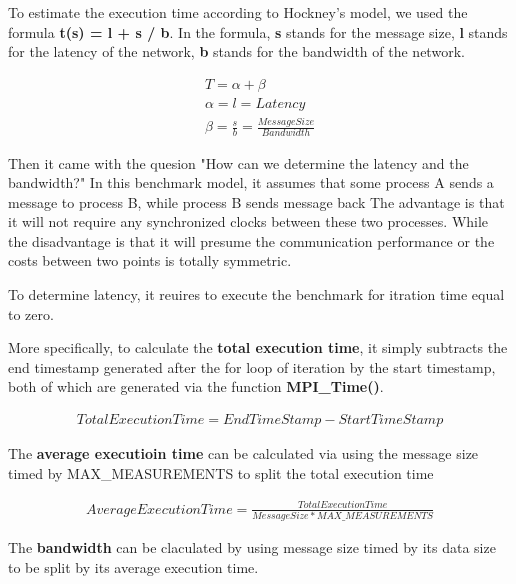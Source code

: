 

To estimate the execution time according to Hockney's model,
we used the formula \textbf{t(s) = l + s / b}. In the formula,
\textbf{s} stands for the message size,
\textbf{l} stands for the latency of the network,
\textbf{b} stands for the bandwidth of the network.


\begin{gather*}
    T = \alpha + \beta \\
    \alpha = l = Latency \\
    \beta = \frac{s}{b} = \frac{Message Size}{Bandwidth}
\end{gather*}


Then it came with the quesion "How can we determine the latency and the bandwidth?"
In this benchmark model, it assumes that some process A sends a message to process B, while process B sends message back
The advantage is that it will not require any synchronized clocks between these two processes.
While the disadvantage is that it will presume the communication performance or the costs between two points is totally symmetric.

To determine latency, it reuires to execute the benchmark for itration time equal to zero.

More specifically, to calculate the \textbf{total execution time},
it simply subtracts the end timestamp generated after the for loop of iteration
by the start timestamp, both of which are generated via the function \textbf{MPI\_Time()}.

\begin{equation*}
    \begin{aligned}
        TotalExecutionTime = EndTimeStamp - StartTimeStamp
    \end{aligned}
\end{equation*}

The \textbf{average executioin time} can be calculated via using the message size timed by MAX\_MEASUREMENTS to split the total execution time

\begin{equation*}
    \begin{aligned}
        AverageExecutionTime = \frac{TotalExecutionTime} {MessageSize * MAX\_MEASUREMENTS}
    \end{aligned}
\end{equation*}

The \textbf{bandwidth} can be claculated by using message size timed by its data size to be split by its average execution time.

